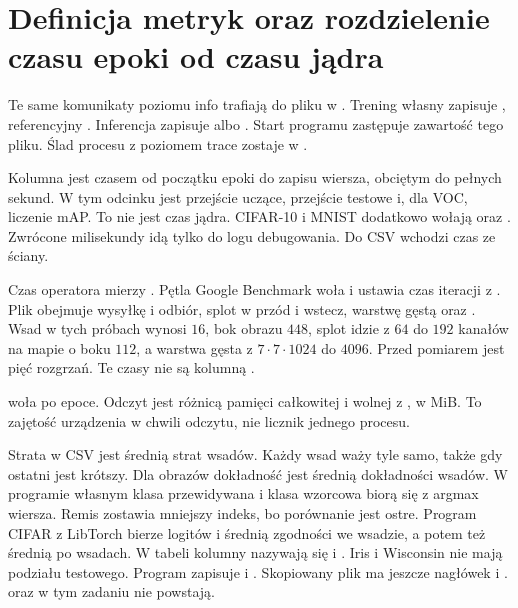 \section{Definicja metryk oraz rozdzielenie czasu epoki od czasu jądra}

Te same komunikaty poziomu info trafiają do pliku w . Trening własny zapisuje , referencyjny . Inferencja zapisuje  albo . Start programu zastępuje zawartość tego pliku. Ślad procesu z poziomem trace zostaje w .

Kolumna  jest czasem  od początku epoki do zapisu wiersza, obciętym do pełnych sekund. W tym odcinku jest przejście uczące, przejście testowe i, dla VOC, liczenie mAP. To nie jest czas jądra. CIFAR-10 i MNIST dodatkowo wołają  oraz . Zwrócone milisekundy idą tylko do logu debugowania. Do CSV wchodzi czas ze ściany.

Czas operatora mierzy . Pętla Google Benchmark woła  i ustawia czas iteracji z . Plik obejmuje wysyłkę i odbiór, splot w przód i wstecz, warstwę gęstą oraz . Wsad w tych próbach wynosi \(16\), bok obrazu \(448\), splot idzie z \(64\) do \(192\) kanałów na mapie o boku \(112\), a warstwa gęsta z \(7\cdot 7\cdot 1024\) do \(4096\). Przed pomiarem jest pięć rozgrzań. Te czasy nie są kolumną .

 woła  po epoce. Odczyt jest różnicą pamięci całkowitej i wolnej z , w MiB. To zajętość urządzenia w chwili odczytu, nie licznik jednego procesu.

Strata w CSV jest średnią strat wsadów. Każdy wsad waży tyle samo, także gdy ostatni jest krótszy. Dla obrazów dokładność jest średnią dokładności wsadów. W programie własnym klasa przewidywana i klasa wzorcowa biorą się z argmax wiersza. Remis zostawia mniejszy indeks, bo porównanie jest ostre. Program CIFAR z LibTorch bierze  logitów i średnią zgodności we wsadzie, a potem też średnią po wsadach. W tabeli kolumny nazywają się  i . Iris i Wisconsin nie mają podziału testowego. Program zapisuje  i . Skopiowany plik ma jeszcze nagłówek  i .  oraz  w tym zadaniu nie powstają.

